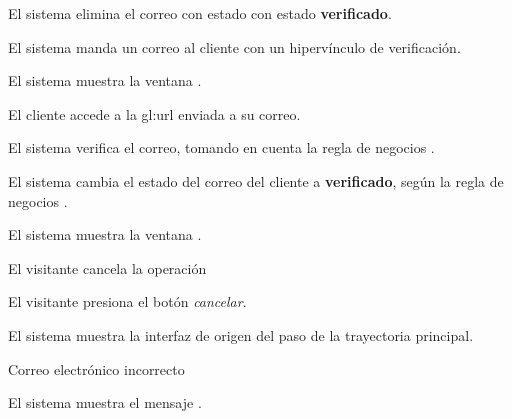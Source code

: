{\begin{trayectoriaPrincipal}
    \item El sistema elimina el correo con estado con estado \textbf{verificado}.

    \item El sistema manda un correo al cliente con un hipervínculo de
      verificación.

    \item El sistema muestra la ventana
      .

    \item El cliente accede a la \gls{gl:url} enviada a su correo.

    \item El sistema verifica el correo, tomando en cuenta la regla de negocios
      .

    \item El sistema cambia el estado del correo del cliente a
      \textbf{verificado}, según la regla de negocios
      .

    \item El sistema muestra la ventana
      .

  \end{trayectoriaPrincipal}


  \begin{trayectoriaAlternativa}[ta:cancelar]
    {El visitante cancela la operación}

    \item El visitante presiona el botón \textit{cancelar}.

    \item El sistema muestra la interfaz de origen del paso
       de la trayectoria principal.

  \end{trayectoriaAlternativa}


  \begin{trayectoriaAlternativa}
    {Correo electrónico incorrecto}

    \item El sistema muestra el mensaje .


\end{trayectoriaAlternativa}}
